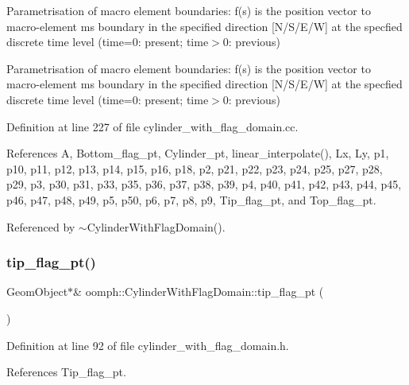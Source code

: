 Parametrisation of macro element boundaries\+: f(s) is the position vector to macro-\/element m\textquotesingle{}s boundary in the specified direction \mbox{[}N/\+S/\+E/W\mbox{]} at the specfied discrete time level (time=0\+: present; time$>$0\+: previous) 

Parametrisation of macro element boundaries\+: f(s) is the position vector to macro-\/element m\textquotesingle{}s boundary in the specified direction \mbox{[}N/\+S/\+E/W\mbox{]} at the specfied discrete time level (time=0\+: present; time$>$0\+: previous) 

Definition at line 227 of file cylinder\+\_\+with\+\_\+flag\+\_\+domain.\+cc.



References A, Bottom\+\_\+flag\+\_\+pt, Cylinder\+\_\+pt, linear\+\_\+interpolate(), Lx, Ly, p1, p10, p11, p12, p13, p14, p15, p16, p18, p2, p21, p22, p23, p24, p25, p27, p28, p29, p3, p30, p31, p33, p35, p36, p37, p38, p39, p4, p40, p41, p42, p43, p44, p45, p46, p47, p48, p49, p5, p50, p6, p7, p8, p9, Tip\+\_\+flag\+\_\+pt, and Top\+\_\+flag\+\_\+pt.



Referenced by $\sim$\+Cylinder\+With\+Flag\+Domain().

\mbox{\label{classoomph_1_1CylinderWithFlagDomain_a9977cf9b4b71f83ba0f4d253164d4e00}} 
\subsubsection{\texorpdfstring{tip\+\_\+flag\+\_\+pt()}{tip\_flag\_pt()}}
{\footnotesize\ttfamily Geom\+Object$\ast$\& oomph\+::\+Cylinder\+With\+Flag\+Domain\+::tip\+\_\+flag\+\_\+pt (\begin{DoxyParamCaption}{ }\end{DoxyParamCaption})\hspace{0.3cm}{\ttfamily [inline]}}



Definition at line 92 of file cylinder\+\_\+with\+\_\+flag\+\_\+domain.\+h.



References Tip\+\_\+flag\+\_\+pt.



